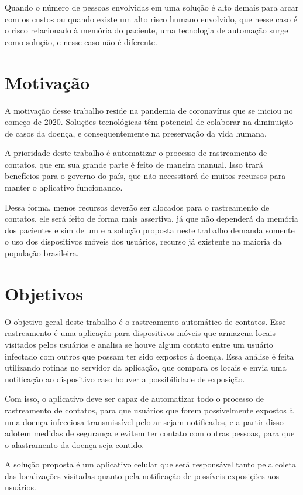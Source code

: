 Quando o número de pessoas envolvidas em uma solução é alto demais para arcar com os custos ou quando existe um alto risco humano envolvido, que nesse caso é o risco relacionado à memória do paciente, uma tecnologia de automação surge como solução, e nesse caso não é diferente.

\section{Motivação}\label{sec:motivacao}
A motivação desse trabalho reside na pandemia de coronavírus que se iniciou no começo de 2020. Soluções tecnológicas têm potencial de colaborar na diminuição de casos da doença, e consequentemente na preservação da vida humana. 

A prioridade deste trabalho é automatizar o processo de rastreamento de contatos, que em sua grande parte é feito de maneira manual. Isso trará benefícios para o governo do país, que não necessitará de muitos recursos para manter o aplicativo funcionando.

Dessa forma, menos recursos deverão ser alocados para o rastreamento de contatos, ele será feito de forma mais assertiva, já que não dependerá da memória dos pacientes e sim de um  e a solução proposta neste trabalho demanda somente o uso dos dispositivos móveis dos usuários, recurso já existente na maioria da população brasileira. 

\section{Objetivos}\label{sec:objetivos}
O objetivo geral deste trabalho é o rastreamento automático de contatos. Esse rastreamento é uma aplicação para dispositivos móveis que armazena locais visitados pelos usuários e analisa se houve algum contato entre um usuário infectado com outros que possam ter sido expostos à doença. Essa análise é feita utilizando rotinas no servidor da aplicação, que compara os locais e envia uma notificação ao dispositivo caso houver a possibilidade de exposição.

Com isso, o aplicativo deve ser capaz de automatizar todo o processo de rastreamento de contatos, para que usuários que forem possivelmente expostos à uma doença infecciosa transmissível pelo ar sejam notificados, e a partir  disso adotem medidas de segurança e evitem ter contato com outras pessoas, para que o alastramento da doença seja contido.

A solução proposta é um aplicativo celular que será responsável tanto pela coleta das localizações visitadas quanto pela notificação de possíveis exposições aos usuários.

